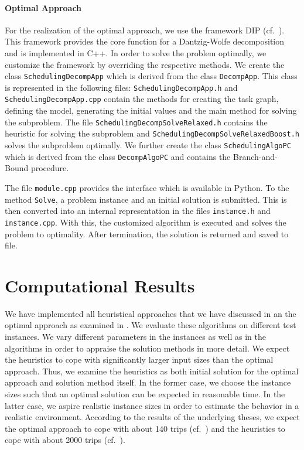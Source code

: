 \paragraph{Optimal Approach} \parfill

For the realization of the optimal approach, we use the framework DIP (cf.~\cite{DIP}). This framework provides the core function for a Dantzig-Wolfe decomposition and is implemented in C++. In order to solve the problem optimally, we customize the framework by overriding the respective methods. We create the class \texttt{SchedulingDecompApp} which is derived from the class \texttt{DecompApp}. This class is represented in the following files: \texttt{SchedulingDecompApp.h} and \texttt{SchedulingDecompApp.cpp} contain the methods for creating the task graph, defining the model, generating the initial values and the main method for solving the subproblem. The file \texttt{SchedulingDecompSolveRelaxed.h} contains the heuristic for solving the subproblem and \texttt{SchedulingDecompSolveRelaxedBoost.h} solves the subproblem optimally. We further create the class \texttt{SchedulingAlgoPC} which is derived from the class \texttt{DecompAlgoPC} and contains the Branch-and-Bound procedure.

The file \texttt{module.cpp} provides the interface which is available in Python. To the method \texttt{Solve}, a problem instance and an initial solution is submitted. This is then converted into an internal representation in the files \texttt{instance.h} and \texttt{instance.cpp}. With this, the customized algorithm is executed and solves the problem to optimality. After termination, the solution is returned and saved to file.


\section{Computational Results}
\label{sec:computational_results}

We have implemented all heuristical approaches that we have discussed in  an the optimal approach as examined in . We evaluate these algorithms on different test instances. We vary different parameters in the instances as well as in the algorithms in order to appraise the solution methods in more detail. We expect the heuristics to cope with significantly larger input sizes than the optimal approach. Thus, we examine the heuristics as both initial solution for the optimal approach and solution method itself. In the former case, we choose the instance sizes such that an optimal solution can be expected in reasonable time. In the latter case, we aspire realistic instance sizes in order to estimate the behavior in a realistic environment. According to the results of the underlying theses, we expect the optimal approach to cope with about 140 trips (cf.~\cite[p.~139]{Kaiser}) and the heuristics to cope with about 2000 trips (cf.~\cite[p.~138]{Knoll}).

